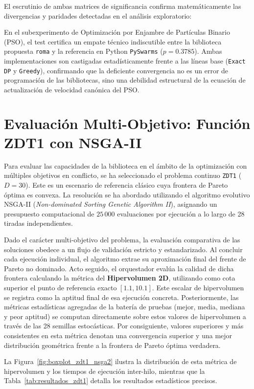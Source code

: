\documentclass[12pt,a4paper,twoside,openright]{book}
\begin{document}
    El escrutinio de ambas matrices de significancia confirma matemáticamente las divergencias y paridades detectadas en el análisis exploratorio:

    En el subexperimento de Optimización por Enjambre de Partículas Binario (PSO), el test certifica un empate técnico indiscutible entre la biblioteca propuesta \texttt{roma} y la referencia en Python \texttt{PySwarms} ($p = 0.3785$). Ambas implementaciones son castigadas estadísticamente frente a las líneas base (\texttt{Exact DP} y \texttt{Greedy}), confirmando que la deficiente convergencia no es un error de programación de las bibliotecas, sino una debilidad estructural de la ecuación de actualización de velocidad canónica del PSO.

\section{Evaluación Multi-Objetivo: Función ZDT1 con NSGA-II}  
    Para evaluar las capacidades de la biblioteca en el ámbito de la optimización con múltiples objetivos en conflicto, se ha seleccionado el problema continuo \texttt{ZDT1} ($D=30$). Este es un escenario de referencia clásico cuya frontera de Pareto óptima es convexa. La resolución se ha abordado utilizando el algoritmo evolutivo NSGA-II (\textit{Non-dominated Sorting Genetic Algorithm II}), asignando un presupuesto computacional de $25\,000$ evaluaciones por ejecución a lo largo de 28 tiradas independientes.

    Dado el carácter multi-objetivo del problema, la evaluación comparativa de las soluciones obedece a un flujo de validación estricto y estandarizado. Al concluir cada ejecución individual, el algoritmo extrae su aproximación final del frente de Pareto no dominado. Acto seguido, el orquestador evalúa la calidad de dicha frontera calculando la métrica del \textbf{Hipervolumen 2D}, utilizando como cota superior el punto de referencia exacto $[1.1, 10.1]$. Este escalar de hipervolumen se registra como la aptitud final de esa ejecución concreta. Posteriormente, las métricas estadísticas agregadas de la batería de pruebas (mejor, media, mediana y peor aptitud) se computan directamente sobre estos valores de hipervolumen a través de las 28 semillas estocásticas. Por consiguiente, valores superiores y más consistentes en esta métrica denotan una convergencia superior y una mejor distribución geométrica frente a la frontera de Pareto óptima verdadera.

    La Figura~\ref{fig:boxplot_zdt1_nsga2} ilustra la distribución de esta métrica de hipervolumen y los tiempos de ejecución inter-hilo, mientras que la Tabla~\ref{tab:resultados_zdt1} detalla los resultados estadísticos precisos.
\end{document}
